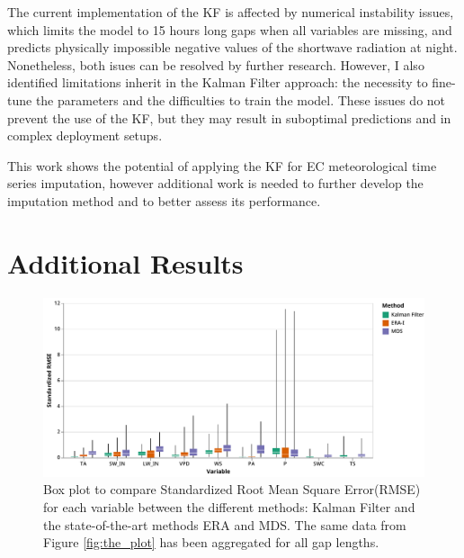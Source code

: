 \documentclass{article}
\newcommand{\imgwidth}{6in}
\let\Oldsection\section
\renewcommand{\section}{\FloatBarrier\Oldsection}
\let\Oldsubsection\subsection
\renewcommand{\subsection}{\FloatBarrier\Oldsubsection}
\begin{document}
The current implementation of the KF is affected by numerical instability issues, which limits the model to  15 hours long gaps when all variables are missing, and predicts physically impossible negative values of the shortwave radiation at night. Nonetheless, both isues can be resolved by further research. However, I also identified limitations inherit in the Kalman Filter approach: the necessity to fine-tune the parameters and the difficulties to train the model. These issues do not prevent the use of the KF, but they may result in suboptimal predictions and in complex deployment setups.

This work shows the potential of applying the KF for EC meteorological time series imputation, however additional work is needed to further develop the imputation method and to better assess its performance. 

\printbibliography

\pagebreak

\appendix

\renewcommand\thefigure{\thesection.\arabic{figure}} 
\renewcommand\thetable{\thesection.\arabic{table}} 
\renewcommand\theequation{\thesection.\arabic{equation}} 

\FloatBarrier

\section{Additional Results}

\setcounter{figure}{0} 
\setcounter{table}{0} 


\begin{figure}[H]
    \centerline{\includegraphics[width=\imgwidth]{the_plot_stand}}
\caption{Box plot to compare Standardized Root Mean Square Error(RMSE) for each variable between the different methods: Kalman Filter and the state-of-the-art methods ERA and MDS. The same data from Figure \ref{fig:the_plot} has been aggregated for all gap lengths.}
\label{fig:the_plot_stand}
\end{figure}
\end{document}
